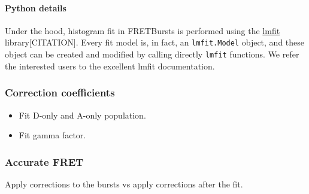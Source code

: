 \paragraph{Python details}
Under the hood, histogram fit in FRETBursts is performed using the
\href{http://lmfit.github.io/lmfit-py/}{lmfit} library[CITATION].
Every fit model is, in fact, an \verb|lmfit.Model| object, and these object
can be created and modified by calling directly \verb|lmfit| functions.
We refer the interested users to the excellent lmfit documentation.

\subsubsection{Correction coefficients}

\begin{itemize}
\item Fit D-only and A-only population.
\item Fit gamma factor.
\end{itemize}


\subsubsection{Accurate FRET}

Apply corrections to the bursts vs apply corrections after the fit.


